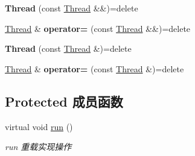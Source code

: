 \begin{DoxyCompactItemize}
\mbox{\label{classThread_a9c8be569889e6acc065a9db76f738952}} 
{\bfseries Thread} (const \hyperlink{classThread}{Thread} \&\&)=delete
\item 
\mbox{\label{classThread_ab6968c245fad4970965b3bf9f6027642}} 
\hyperlink{classThread}{Thread} \& {\bfseries operator=} (const \hyperlink{classThread}{Thread} \&\&)=delete
\item 
\mbox{\label{classThread_a71c9b9c8fb2e87eb14279f6233a83143}} 
{\bfseries Thread} (const \hyperlink{classThread}{Thread} \&)=delete
\item 
\mbox{\label{classThread_a832b2ddff787923f27430d95df55c83d}} 
\hyperlink{classThread}{Thread} \& {\bfseries operator=} (const \hyperlink{classThread}{Thread} \&)=delete
\end{DoxyCompactItemize}
\subsection*{Protected 成员函数}
\begin{DoxyCompactItemize}
\item 
\mbox{\label{classThread_a7574ff300357f9d3193db03b83937eac}} 
virtual void \hyperlink{classThread_a7574ff300357f9d3193db03b83937eac}{run} ()
\begin{DoxyCompactList}\small\item\em run 重载实现操作 \end{DoxyCompactList}\end{DoxyCompactItemize}
